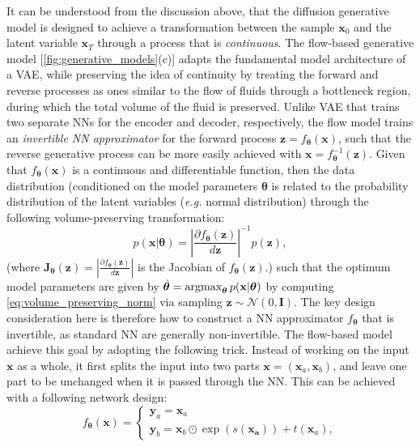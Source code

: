 It can be understood from the discussion above,  that the diffusion generative model is designed to achieve a  transformation between the sample $\bm{x}_0$ and the latent variable $\bm{x}_T$ through a process that is \emph{continuous}. The flow-based generative model  [\cref{fig:generative_models}(c)] adapts the fundamental model architecture of a VAE, while preserving the idea of continuity by treating the forward and reverse processes as ones similar to the flow of fluids through a bottleneck region, during which the total volume of the fluid is preserved. Unlike VAE that trains two separate NNs for the encoder and decoder, respectively, the flow model trains an \emph{invertible NN approximator} for the forward process $\bm{z}=f_{\boldsymbol{\theta}}(\bm{x})$, such that the reverse generative process can be more easily achieved with $\bm{x}=f_{\boldsymbol{\theta}}^{-1}(\bm{z})$. Given that $f_{\boldsymbol{\theta}}(\bm{x})$ is a continuous and differentiable function, then the data distribution (conditioned on the model parameters $\boldsymbol{\theta}$ is related to the probability distribution of the latent variables (\emph{e.g.}  normal distribution) through the following volume-preserving transformation:
\begin{equation}
    \label{eq:volume_preserving_norm}
    p(\bm{x}|\boldsymbol{\theta})=\left\vert\frac{\partial f_{\boldsymbol{\theta}}(\bm{z})}{d\bm{z}}\right\vert^{-1}p(\bm{z}),
\end{equation}
(where $\bm{J}_{\boldsymbol{\theta}}(\bm{z})=\left\vert\frac{\partial f_{\boldsymbol{\theta}}(\bm{z})}{d\bm{z}}\right\vert$ is the Jacobian of $f_{\boldsymbol{\theta}}(\bm{z})$.) such that the optimum model parameters are given by $\hat{\boldsymbol{\theta}}=\operatorname*{argmax}_{\boldsymbol{\theta}}p(\mathbf{x}|\boldsymbol{\theta})$ by computing \cref{eq:volume_preserving_norm} via sampling $\bm{z}\sim\mathcal{N}(0,\bm{I})$.   The key design consideration here is therefore how to construct a NN approximator $f_{\boldsymbol{\theta}}$ that is invertible, as standard NN are generally non-invertible. \cite{prince2023understanding} The flow-based model achieve this goal by adopting the following trick. Instead of working on the input $\bm{x}$ as a whole, it first splits the input into two parts $\bm{x}=(\bm{x}_a,\bm{x}_b)$, and leave one part to be unchanged when it is passed through the NN. This  can be achieved with a following network design:
\begin{equation}
    \label{eq:invertible_NN}f_{\boldsymbol{\theta}}(\bm{x})=
    \begin{cases}
        \bm{y}_a=\bm{x}_a\\
        \bm{y}_b=\bm{x}_b\odot\exp(s(\bm{x_a}))+t(\bm{x}_a),
    \end{cases}
\end{equation}
